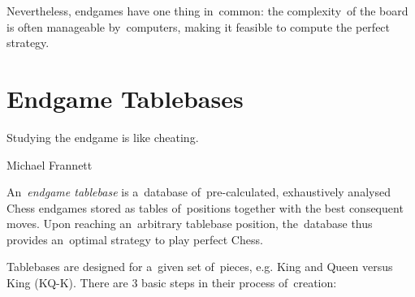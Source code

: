 Nevertheless, endgames have one thing in~common:
the complexity~of the board is often manageable by~computers, making it feasible to compute the perfect strategy.

\section{Endgame Tablebases}
\epigraph{
  Studying the endgame is like cheating.
}{Michael Frannett}
An~\emph{endgame tablebase} is a~database of~pre-calculated, exhaustively analysed Chess endgames stored as tables of~positions together with the best consequent moves.
Upon reaching an~arbitrary tablebase position, the~database thus provides an~optimal strategy to play perfect Chess.

Tablebases are designed for a~given set of~pieces, e.g. \king King and \queen Queen versus \kingB King (KQ-K).
There are 3 basic steps in their process of~creation:
